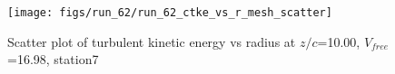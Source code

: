 \begin{figure}[H]
\centering
\texttt{[image: figs/run\_62/run\_62\_ctke\_vs\_r\_mesh\_scatter]}
\caption{Scatter plot of turbulent kinetic energy vs radius at $z/c$=10.00, $V_{free}$=16.98, station7}
\label{fig:run_62_ctke_vs_r_mesh_scatter}
\end{figure}


